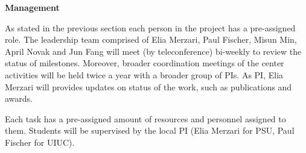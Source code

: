 \documentclass[11pt,letterpaper,english]{article}
\begin{document}
\begin{flushleft}
{\noindent \bf  {Management}}

As stated in the previous section each person in the project has a pre-assigned role. The leadership team comprised of Elia Merzari, Paul Fischer, Misun Min, April Novak and Jun Fang will meet (by teleconference) bi-weekly to review the status of milestones.  Moreover, broader coordination meetings of the center activities will be held twice a year with a broader group of PIs. As PI, Elia Merzari will provides updates on status of the work, such as publications and awards.

Each task has a pre-assigned amount of resources and personnel assigned to them. Students will be supervised by the local PI (Elia Merzari for PSU, Paul Fischer for UIUC).

\end{flushleft}
\end{document}
